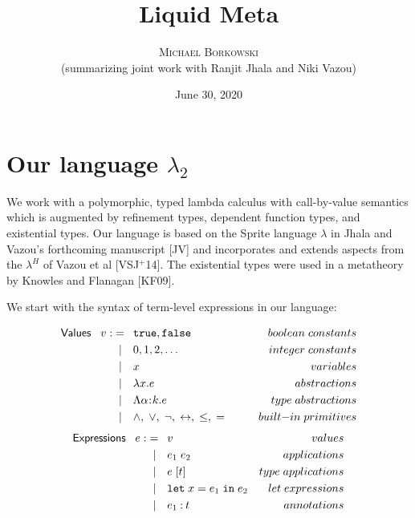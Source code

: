 \documentclass[11pt]{article}
\newcommand{\bind}{\hspace{0.05em}{:}\hspace{0.05em}} %
\newcommand{\col}{\mathbin{:}}       %
\begin{document}
\title{Liquid Meta}
\author{\textsc{Michael Borkowski} \\ (summarizing joint work with {\sc Ranjit Jhala} and {\sc Niki Vazou})}
\date{June 30, 2020}

\maketitle
\thispagestyle{empty}

\section{Our language $\lambda_2$}

We work with a polymorphic, typed lambda calculus with call-by-value semantics which is augmented by refinement types, dependent function types, and existential types. Our language is based on the Sprite language $\lambda$ in Jhala and Vazou's forthcoming manuscript [JV] and incorporates and extends aspects from the $\lambda^H$ of Vazou et al [VSJ$^+$14]. The existential types were used in a metatheory by Knowles and Flanagan [KF09].

We start with the syntax of term-level expressions in our language:

\begin{align*}
{\sf Values} \;\;\; v :&=\;\: {\tt true}, {\tt false}
                         {\kern 5em}& boolean\; constants\\
                   &\;\;|\quad 0, 1, 2, \ldots 
                         & integer \; constants\\
                   &\;\;|\quad x & variables\\
                   &\;\;|\quad \lambda x . e
                         & abstractions \\
                   &\;\;|\quad \Lambda \alpha\bind k .e
                         & type\; abstractions\\
                   &\;\;|\quad \wedge, \; \vee, \;\neg,\; 
                         \leftrightarrow,\; \leq,\; =                     
                         & built{\rm -}in\; primitives 
\end{align*}
\begin{align*}
{\sf Expressions} \;\;\; e :&=\;\: v {\kern 5 em}& values \\
	                &\;\;|\quad e_1\; e_2 & applications \\
	                &\;\;|\quad e\; [t] & type\; applications\\
	                &\;\;|\quad {\tt let}\; x = e_1
	                      \; {\tt in} \; e_2 & let\; expressions\\
	                &\;\;|\quad e_1 \col t & annotations \\
\end{align*}
\end{document}
